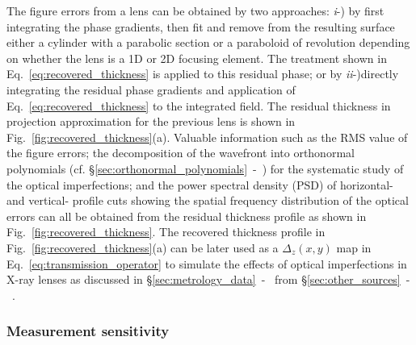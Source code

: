 \begin{refsection}
The figure errors from a lens can be obtained by two approaches: \textit{i}-) by first integrating the phase gradients, then fit and remove from the resulting surface either a cylinder with a parabolic section or a paraboloid of revolution depending on whether the lens is a 1D or 2D focusing element. The treatment shown in Eq.~\ref{eq:recovered_thickness} is applied to this residual phase; or by \textit{ii}-)directly integrating the residual phase gradients and application of Eq.~\ref{eq:recovered_thickness} to the integrated field. The residual thickness in projection approximation for the previous lens is shown in Fig.~\ref{fig:recovered_thickness}(a). Valuable information such as the RMS value of the figure errors; the decomposition of the wavefront into orthonormal polynomials (cf. \S\ref{sec:orthonormal_polynomials}~-~\textit{}) for the systematic study of the optical imperfections; and the power spectral density (PSD) of horizontal- and vertical- profile cuts showing the spatial frequency distribution of the optical errors can all be obtained from the residual thickness profile as shown in Fig.~\ref{fig:recovered_thickness}. The recovered thickness profile in Fig.~\ref{fig:recovered_thickness}(a) can be later used as a $\Delta_z(x,y)$ map in Eq.~\ref{eq:transmission_operator} to simulate the effects of optical imperfections in X-ray lenses as discussed in \S\ref{sec:metrology_data}~-~\textit{} from \S\ref{sec:other_sources}~-~\textit{}. 

\subsubsection*{Measurement sensitivity}


\end{refsection}
